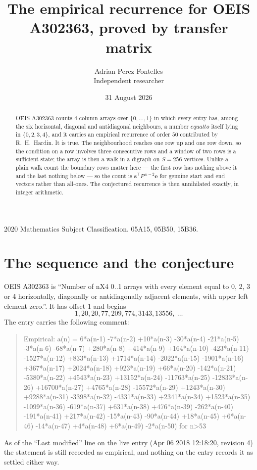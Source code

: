 \documentclass[11pt,a4paper]{article}
\title{The empirical recurrence for OEIS A302363, proved by transfer matrix}
\author{Adrian Perez Fontelles\\ \small Independent researcher}
\date{31 August 2026}
\theoremstyle{plain}
\theoremstyle{definition}
\begin{document}
\maketitle

\begin{abstract}
OEIS A302363 counts $4$-column arrays over $\{0,\dots,1\}$ in which every entry has,
among the six horizontal, diagonal and antidiagonal neighbours, a number $equal to$ itself lying in $\{0,2,3,4\}$, and it carries an empirical
recurrence of order $50$ contributed by R.~H.~Hardin. It is true. The neighbourhood
reaches one row up and one row down, so the condition on a row involves three consecutive
rows and a window of two rows is a sufficient state; the array is then a walk in a digraph
on $S=256$ vertices. Unlike a plain walk count the boundary rows matter here --- the first
row has nothing above it and the last nothing below --- so the count is
$\mathbf{s}^{\!\top}P^{\,n-2}\mathbf{e}$ for genuine start and end vectors rather than
all-ones. The conjectured recurrence is then annihilated exactly, in integer arithmetic.
\end{abstract}

\noindent\small 2020 Mathematics Subject Classification. 05A15, 05B50, 15B36.\normalsize

\section{The sequence and the conjecture}

OEIS A302363 is ``Number of nX4 0..1 arrays with every element equal to 0, 2, 3 or 4 horizontally, diagonally or antidiagonally adjacent elements, with upper left element zero.''. It has offset
$1$ and begins
\[
1, 20, 20, 77, 209, 774, 3143, 13556,\ \dots
\]
The entry carries the following comment:
\begin{quote}\small
Empirical: a(n) = 6*a(n-1) -7*a(n-2) +10*a(n-3) -30*a(n-4) -21*a(n-5) -3*a(n-6) -68*a(n-7) +280*a(n-8) +414*a(n-9) +164*a(n-10) -423*a(n-11) -1527*a(n-12) +833*a(n-13) +1714*a(n-14) -2022*a(n-15) -1901*a(n-16) +367*a(n-17) +2024*a(n-18) +923*a(n-19) +66*a(n-20) -142*a(n-21) -5380*a(n-22) +4543*a(n-23) +13152*a(n-24) -11763*a(n-25) -12833*a(n-26) +16700*a(n-27) +4765*a(n-28) -15572*a(n-29) +1243*a(n-30) +9288*a(n-31) -3398*a(n-32) -4331*a(n-33) +2341*a(n-34) +1523*a(n-35) -1099*a(n-36) -619*a(n-37) +631*a(n-38) +476*a(n-39) -262*a(n-40) -191*a(n-41) +217*a(n-42) -15*a(n-43) -90*a(n-44) +18*a(n-45) +6*a(n-46) -14*a(n-47) +4*a(n-48) +6*a(n-49) -2*a(n-50) for n>53
\end{quote}
As of the ``Last modified'' line on the live entry (Apr 06 2018 12:18:20, revision
4) the statement is still recorded as empirical, and nothing on the entry
records it as settled either way.
\end{document}
